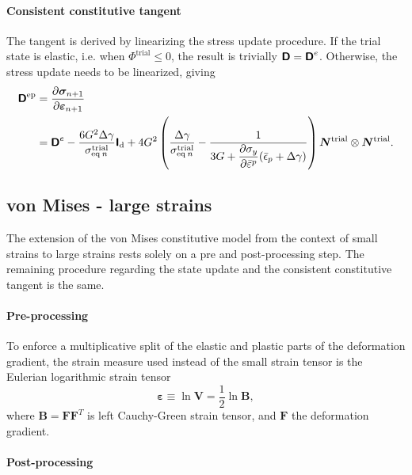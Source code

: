 \paragraph{Consistent constitutive tangent}
The tangent is derived by linearizing the stress update procedure.
If the trial state is elastic, i.e. when \(\Phi^\text{trial} \leq 0\), the result is trivially \(\boldsymbol{\mathsf{D}}=\boldsymbol{\mathsf{D}}^e\).
Otherwise, the stress update needs to be linearized, giving
\begin{equation}
\begin{aligned}
\boldsymbol{\mathsf{D}}^\text{ep} &=\frac{\partial \bm{\sigma}_ {n+1}}{\partial \bm \varepsilon_ {n+1}} \\
&=\boldsymbol{\mathsf{D}}^e-\frac{6 G^{2} \Delta \gamma}{\sigma_{\mathrm{eq}\:n}^\text{trial}} \boldsymbol{\mathsf{I}}_{\mathrm{d}}+4 G^{2}\left(\frac{\Delta \gamma}{\sigma_{\mathrm{eq}\:n}^\text{trial}}-\frac{1}{3 G+ \displaystyle{\frac{\partial \sigma_y}{\partial \bar{\varepsilon}^p}}(\bar{\epsilon}_p+\Delta \gamma)}\right)\bm N^\text{trial} \otimes\bm N^\text{trial}.
\end{aligned}
\end{equation}

\subsection{von Mises - large strains}

The extension of the von Mises constitutive model from the context of small strains to large strains rests solely on a pre and post-processing step.
The remaining procedure regarding the state update and the consistent constitutive tangent is the same.

\paragraph{Pre-processing}

To enforce a multiplicative split of the elastic and plastic parts of the deformation gradient, the strain measure used instead of the small strain tensor is the Eulerian logarithmic strain tensor
\begin{equation}
  \bm \varepsilon \equiv \ln \bm V = \frac{1}{2}\ln \bm B,
\end{equation}
where \(\bm B = \bm F\bm F^T\) is left Cauchy-Green strain tensor, and \(\bm F\) the deformation gradient.

\paragraph{Post-processing}

